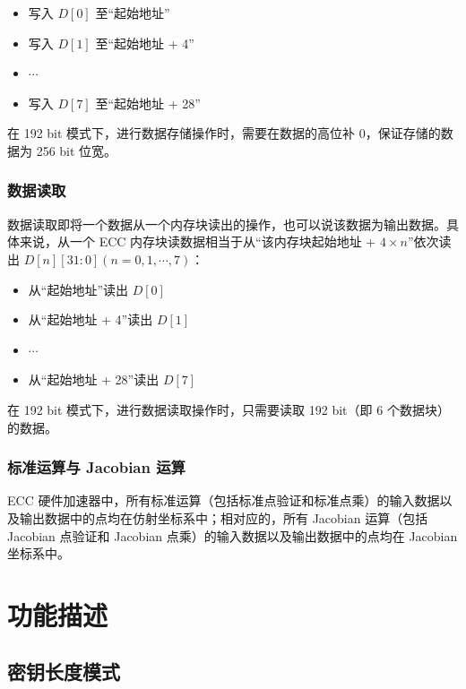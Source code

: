 \documentclass[main\_\_CN.tex]{subfiles}
\begin{document}
\begin{itemize}
    \item 写入 $D[0]$ 至“起始地址”
    \item 写入 $D[1]$ 至“起始地址 + 4”
    \item $\cdots$
    \item 写入 $D[7]$ 至“起始地址 + 28”
\end{itemize}
\begin{tiplisting}
在 192 bit 模式下，进行数据存储操作时，需要在数据的高位补 0，保证存储的数据为 256 bit 位宽。
\end{tiplisting}

\subsubsection{数据读取}

数据读取即将一个数据从一个内存块读出的操作，也可以说该数据为输出数据。具体来说，从一个 ECC 内存块读数据相当于从“该内存块起始地址 + $
4 \times n$”依次读出 $D[n][31:0] (n=0, 1, \cdots, 7)$：
\begin{itemize}
    \item 从“起始地址”读出 $D[0]$
    \item 从“起始地址 + 4”读出 $D[1]$
    \item $\cdots$
    \item 从“起始地址 + 28”读出 $D[7]$
\end{itemize}

\begin{tiplisting}
在 192 bit 模式下，进行数据读取操作时，只需要读取 192 bit（即 6 个数据块）的数据。
\end{tiplisting}

\subsubsection{标准运算与 Jacobian 运算}

\chipname{} ECC 硬件加速器中，所有标准运算（包括标准点验证和标准点乘）的输入数据以及输出数据中的点均在仿射坐标系中；相对应的，所有 Jacobian 运算（包括 Jacobian 点验证和 Jacobian 点乘）的输入数据以及输出数据中的点均在 Jacobian 坐标系中。

\section{功能描述}
\label{sec:ecc-mode-config}
\subsection{密钥长度模式}
\end{document}
